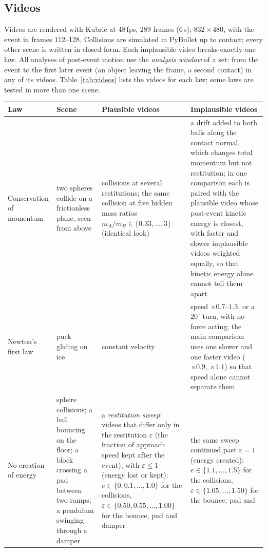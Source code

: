 \documentclass[10pt]{article}
\newcommand{\eps}{\varepsilon}
\begin{document}
\subsection{Videos}
\label{sec:videos}
Videos are rendered with Kubric at 48\,fps, 289 frames (6\,s), $832\times480$, with the event in frames 112--128. Collisions are simulated in PyBullet up to contact; every other scene
is written in closed form. Each implausible video breaks exactly one law. All analyses
of post-event motion use the \emph{analysis window} of a set: from the event to the first later event (an object
leaving the frame, a second contact) in any of its videos. Table~\ref{tab:videos} lists the videos for
each law; some laws are tested in more than one scene.

\begin{table}[h]
\centering\small
\renewcommand{\arraystretch}{1.25}
\begin{tabularx}{\linewidth}{@{}>{\raggedright\arraybackslash}p{1.9cm}>{\raggedright\arraybackslash}p{3.3cm}>{\raggedright\arraybackslash}X>{\raggedright\arraybackslash}X@{}}
\toprule
Law & Scene & Plausible videos & Implausible videos \\
\midrule
Conservation of momentum & two spheres collide on a frictionless plane, seen from above &
collisions at several restitutions; the same collision at five hidden mass ratios $m_A/m_B\in\{0.33,\dots,3\}$ (identical look) &
a drift added to both balls along the contact normal, which changes total momentum but not restitution; in one
comparison each is paired with the plausible video whose post-event kinetic energy is closest, with faster and
slower implausible videos weighted equally, so that kinetic energy alone cannot tell them apart \\
Newton's first law & puck gliding on ice & constant velocity & speed $\times0.7$--$1.3$, or a $20^\circ$ turn, with no
force acting; the main comparison uses one slower and one faster video ($\times0.9$, $\times1.1$) so that speed alone
cannot separate them \\
No creation of energy & sphere collisions; a ball bouncing on the floor; a block crossing a pad between two ramps; a pendulum swinging
through a damper & a \emph{restitution sweep}: videos that differ only in the restitution $\eps$ (the fraction of
approach speed kept after the event), with $\eps\le1$ (energy lost or kept): $e\in\{0,0.1,\dots,1.0\}$ for the
collisions, $\eps\in\{0.50,0.55,\dots,1.00\}$ for the bounce, pad and damper & the same sweep continued past $\eps=1$
(energy created): $e\in\{1.1,\dots,1.5\}$ for the collisions, $\eps\in\{1.05,\dots,1.50\}$ for the bounce, pad and

\end{tabularx}
\end{table}
\end{document}
